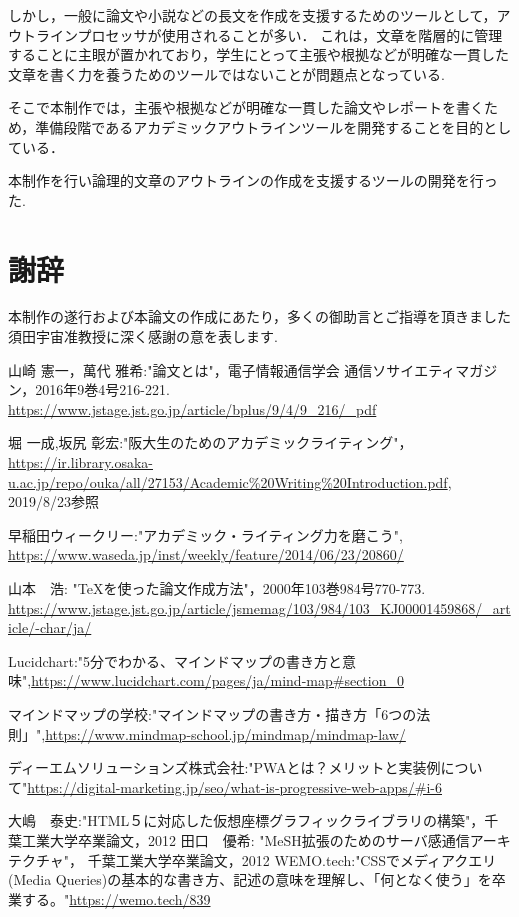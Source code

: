 \documentclass[a4j,12pt]{jarticle}
\begin{document}
しかし，一般に論文や小説などの長文を作成を支援するためのツールとして，アウトラインプロセッサが使用されることが多い．
これは，文章を階層的に管理することに主眼が置かれており，学生にとって主張や根拠などが明確な一貫した文章を書く力を養うためのツールではないことが問題点となっている.

そこで本制作では，主張や根拠などが明確な一貫した論文やレポートを書くため，準備段階であるアカデミックアウトラインツールを開発することを目的としている．

本制作を行い論理的文章のアウトラインの作成を支援するツールの開発を行った.
\newpage
\section*{謝辞}
本制作の遂行および本論文の作成にあたり，多くの御助言とご指導を頂きました須田宇宙准教授に深く感謝の意を表します.


 \begin{thebibliography}{99}
山崎 憲一，萬代 雅希:"論文とは"，電子情報通信学会 通信ソサイエティマガジン，2016年9巻4号216-221.
\url{https://www.jstage.jst.go.jp/article/bplus/9/4/9_216/_pdf}

 堀 一成,坂尻 彰宏:"阪大生のためのアカデミックライティング"，
\url{https://ir.library.osaka-u.ac.jp/repo/ouka/all/27153/Academic%20Writing%20Introduction.pdf}, 2019/8/23参照

早稲田ウィークリー:"アカデミック・ライティング力を磨こう",
\url{https://www.waseda.jp/inst/weekly/feature/2014/06/23/20860/}

 山本　浩: "TeXを使った論文作成方法"，2000年103巻984号770-773.
\url{https://www.jstage.jst.go.jp/article/jsmemag/103/984/103_KJ00001459868/_article/-char/ja/}

 Lucidchart:"5分でわかる、マインドマップの書き方と意味",\url{https://www.lucidchart.com/pages/ja/mind-map#section_0}

 マインドマップの学校:"マインドマップの書き方・描き方「6つの法則」",\url{https://www.mindmap-school.jp/mindmap/mindmap-law/}

 ディーエムソリューションズ株式会社:"PWAとは？メリットと実装例について"\url{https://digital-marketing.jp/seo/what-is-progressive-web-apps/#i-6}

大嶋　泰史:"HTML５に対応した仮想座標グラフィックライブラリの構築"，千葉工業大学卒業論文，2012
田口　優希: "MeSH拡張のためのサーバ感通信アーキテクチャ"， 千葉工業大学卒業論文，2012
 WEMO.tech:"CSSでメディアクエリ(Media Queries)の基本的な書き方、記述の意味を理解し、「何となく使う」を卒業する。"\url{https://wemo.tech/839}

\end{thebibliography}
\end{document}
